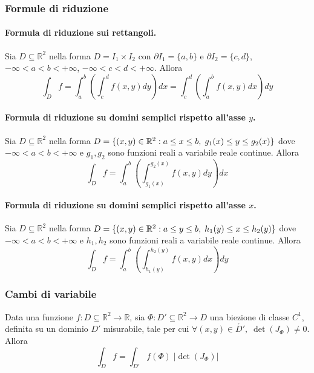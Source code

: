         \subsubsection{Formule di riduzione}
        \paragraph*{Formula di riduzione sui rettangoli.}
            Sia $D \subseteq \mathbb{R}^{2}$ nella forma $D = I_{1} \times I_{2}$ con $\partial I_{1} = \{a, b\}$ e $\partial I_{2} = \{c, d\}$, $-\infty < a < b < +\infty$, $-\infty < c < d < +\infty$.
            Allora
            \[
                \int_{D} f = \int_{a}^{b} \left( \int_{c}^{d} f(x, y) dy \right) dx = \int_{c}^{d} \left( \int_{a}^{b} f(x, y) dx \right) dy
            \]

        \paragraph*{Formula di riduzione su domini semplici rispetto all'asse $y$.}
            Sia $D \subseteq \mathbb{R}^{2}$ nella forma $D = \{(x, y) \in \mathbb{R}^{2} \mathrel{:} a \leq x \leq b, \; g_{1}(x) \leq y \leq g_{2}(x)\}$ dove $-\infty < a < b < +\infty$ e $g_{1}, g_{2}$ sono funzioni reali a variabile reale continue.
            Allora
            \[
                \int_{D} f = \int_{a}^{b} \left( \int_{g_{1}(x)}^{g_{2}(x)} f(x, y) dy \right) dx
            \]

        \paragraph*{Formula di riduzione su domini semplici rispetto all'asse $x$.}
            Sia $D \subseteq \mathbb{R}^{2}$ nella forma $D = \{(x, y) \in \mathbb{R}^{2} \mathrel{:} a \leq y \leq b, \; h_{1}(y) \leq x \leq h_{2}(y)\}$ dove $-\infty < a < b < +\infty$ e $h_{1}, h_{2}$ sono funzioni reali a variabile reale continue.
            Allora
            \[
                \int_{D} f = \int_{a}^{b} \left( \int_{h_{1}(y)}^{h_{2}(y)} f(x, y) dx \right) dy
            \]

        \subsubsection{Cambi di variabile}
            Data una funzione $f: D \subseteq \mathbb{R}^{2} \rightarrow \mathbb{R}$, sia $\Phi: D' \subseteq \mathbb{R}^{2} \rightarrow D$ una biezione di classe $C^{1}$, definita su un dominio $D'$ misurabile, tale per cui $\forall (x, y) \in \mathring{D'}, \; \det(J_{\Phi}) \neq 0$.
            Allora
            \[
                \int_{D} f = \int_{D'} f(\Phi) \; |\det(J_{\Phi})|
            \]

